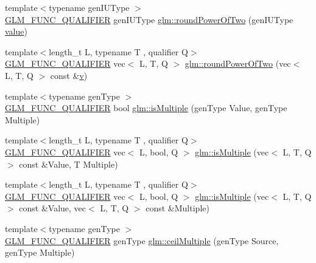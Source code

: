 \begin{DoxyCompactItemize}
\item 
{\footnotesize template$<$typename gen\+I\+U\+Type $>$ }\\\hyperlink{setup_8hpp_a33fdea6f91c5f834105f7415e2a64407}{G\+L\+M\+\_\+\+F\+U\+N\+C\+\_\+\+Q\+U\+A\+L\+I\+F\+I\+ER} gen\+I\+U\+Type \hyperlink{group__gtc__round_gae4e1bf5d1cd179f59261a7342bdcafca}{glm\+::round\+Power\+Of\+Two} (gen\+I\+U\+Type \hyperlink{_s_d_l__opengl__glext_8h_a8ad81492d410ff2ac11f754f4042150f}{value})
\item 
{\footnotesize template$<$length\+\_\+t L, typename T , qualifier Q$>$ }\\\hyperlink{setup_8hpp_a33fdea6f91c5f834105f7415e2a64407}{G\+L\+M\+\_\+\+F\+U\+N\+C\+\_\+\+Q\+U\+A\+L\+I\+F\+I\+ER} vec$<$ L, T, Q $>$ \hyperlink{group__gtc__round_ga258802a7d55c03c918f28cf4d241c4d0}{glm\+::round\+Power\+Of\+Two} (vec$<$ L, T, Q $>$ const \&\hyperlink{_s_d_l__opengl_8h_a10a82eabcb59d2fcd74acee063775f90}{v})
\item 
{\footnotesize template$<$typename gen\+Type $>$ }\\\hyperlink{setup_8hpp_a33fdea6f91c5f834105f7415e2a64407}{G\+L\+M\+\_\+\+F\+U\+N\+C\+\_\+\+Q\+U\+A\+L\+I\+F\+I\+ER} bool \hyperlink{namespaceglm_a1749b696a2f7a956da67d67a557ae134}{glm\+::is\+Multiple} (gen\+Type Value, gen\+Type Multiple)
\item 
{\footnotesize template$<$length\+\_\+t L, typename T , qualifier Q$>$ }\\\hyperlink{setup_8hpp_a33fdea6f91c5f834105f7415e2a64407}{G\+L\+M\+\_\+\+F\+U\+N\+C\+\_\+\+Q\+U\+A\+L\+I\+F\+I\+ER} vec$<$ L, bool, Q $>$ \hyperlink{group__gtc__round_ga354caf634ef333d9cb4844407416256a}{glm\+::is\+Multiple} (vec$<$ L, T, Q $>$ const \&Value, T Multiple)
\item 
{\footnotesize template$<$length\+\_\+t L, typename T , qualifier Q$>$ }\\\hyperlink{setup_8hpp_a33fdea6f91c5f834105f7415e2a64407}{G\+L\+M\+\_\+\+F\+U\+N\+C\+\_\+\+Q\+U\+A\+L\+I\+F\+I\+ER} vec$<$ L, bool, Q $>$ \hyperlink{group__gtc__round_gabb4360e38c0943d8981ba965dead519d}{glm\+::is\+Multiple} (vec$<$ L, T, Q $>$ const \&Value, vec$<$ L, T, Q $>$ const \&Multiple)
\item 
{\footnotesize template$<$typename gen\+Type $>$ }\\\hyperlink{setup_8hpp_a33fdea6f91c5f834105f7415e2a64407}{G\+L\+M\+\_\+\+F\+U\+N\+C\+\_\+\+Q\+U\+A\+L\+I\+F\+I\+ER} gen\+Type \hyperlink{group__gtc__round_ga1d89ac88582aaf4d5dfa5feb4a376fd4}{glm\+::ceil\+Multiple} (gen\+Type Source, gen\+Type Multiple)

\end{DoxyCompactItemize}
